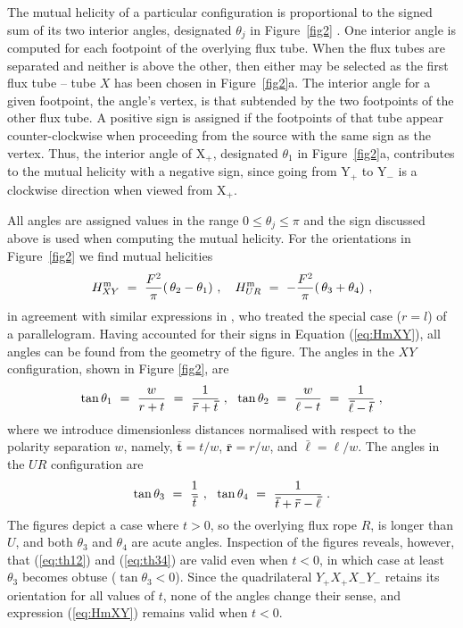 \documentclass[10pt,namedreferneces]{SolarPhysics}
\begin{document}
\begin{article}
The mutual helicity of a particular configuration is proportional to the signed sum of its two interior angles, designated 
$\theta_j$ in Figure\ \ref{fig2} \cite{demoulin06b}.  One interior angle is computed for each footpoint of the overlying flux tube.  When the flux tubes are separated and neither is above the other, then either may be selected as the first flux tube -- tube $X$ has been chosen in Figure\ \ref{fig2}a.  The interior angle for a given footpoint, the angle's vertex, is that subtended by the two footpoints of the other flux tube.  A positive sign is assigned if the footpoints of that tube appear counter-clockwise when proceeding from the source with the same sign as the vertex.  Thus, the interior angle of X$_+$, designated $\theta_1$ in Figure\ \ref{fig2}a, contributes to the mutual helicity with a negative sign, since going from Y$_+$ to Y$_-$ is a clockwise direction when viewed from X$_+$.  

All angles are assigned values in the range $0\le\theta_j\le\pi$ and the sign discussed above is used when computing the mutual helicity.  For the orientations  in Figure\ \ref{fig2} we find mutual helicities
\begin{equation}
  H^{\rm m}_{XY} ~=~ {F^2\over\pi}(\, \theta_2 - \theta_1)~,~~~ H^{\rm m}_{UR} ~=~ -{F^2\over\pi}(\, \theta_3 + \theta_4)~,
  	\label{eq:HmXY}
\end{equation}
in agreement with similar expressions in , who treated the special case ($r=l$) of a parallelogram.  Having accounted for their signs in Equation (\ref{eq:HmXY}), all angles  can be found from the geometry of the figure.  The angles in the $XY$ configuration, shown in Figure \ref{fig2},  are
\begin{equation}
  \tan\theta_1 ~=~{w\over r+t} ~=~{1\over \bm\bar{r}+\bm\bar{t}} ~,~~\tan\theta_2 ~=~{w\over \ell-t} ~=~{1\over \bm\bar{\ell}-\bm\bar{t}} ~,
  	\label{eq:th12}
\end{equation}
where we  introduce dimensionless distances normalised with respect to the polarity separation $w$, namely, $\bm\bar{t}=t/w$, $\bm\bar{r}=r/w$, and $\bm\bar{\ell}=\ell/w$.  The angles in the $UR$ configuration are 
\begin{equation}
  \tan\theta_3 ~=~{1\over \bm\bar{t}} ~,~~\tan\theta_4 ~=~{1\over \bm\bar{t}+\bm\bar{r}-\bm\bar{\ell}} ~.
  	\label{eq:th34}
\end{equation}
The figures depict a case where $t>0$, so the overlying flux rope $R$, is longer than $U$, and both $\theta_3$ and $\theta_4$ are acute angles.  Inspection of the figures reveals, however, that  (\ref{eq:th12}) and (\ref{eq:th34}) are valid even when $t<0$, in which case at least $\theta_3$  becomes obtuse ($\tan\theta_3<0$).  Since the quadrilateral $Y_+X_+X_-Y_-$ retains its orientation for all values of $t$, none of the angles change their sense, and expression (\ref{eq:HmXY}) remains valid when $t<0$.


\end{article}
\end{document}
